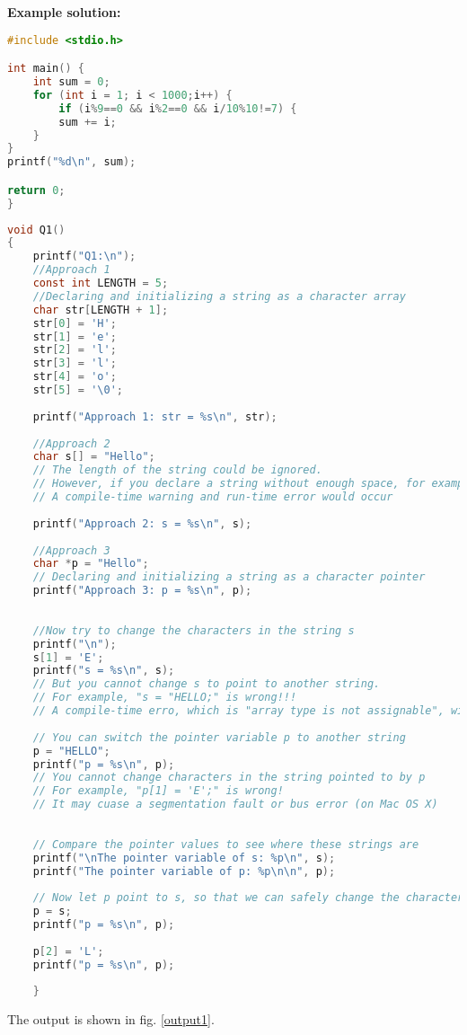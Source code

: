\documentclass[12pt]{article}
\begin{document}
\textbf{Example solution:}
\begin{lstlisting}[language=C]
#include <stdio.h>

int main() {
	int sum = 0;
	for (int i = 1; i < 1000;i++) {
		if (i%9==0 && i%2==0 && i/10%10!=7) {
		sum += i;
	}
}
printf("%d\n", sum);

return 0;
}

\end{lstlisting}
\iffalse
\begin{lstlisting}[language=C, caption=Solution 1]
void Q1()
{
    printf("Q1:\n");
    //Approach 1
	const int LENGTH = 5; 
    //Declaring and initializing a string as a character array
    char str[LENGTH + 1];
    str[0] = 'H';
    str[1] = 'e';
    str[2] = 'l';
    str[3] = 'l';
    str[4] = 'o';
    str[5] = '\0';
    
    printf("Approach 1: str = %s\n", str);
    
    //Approach 2
    char s[] = "Hello";
    // The length of the string could be ignored.
    // However, if you declare a string without enough space, for example "char s[4] = "Hello";"
    // A compile-time warning and run-time error would occur
    
    printf("Approach 2: s = %s\n", s);
    
    //Approach 3
    char *p = "Hello";
    // Declaring and initializing a string as a character pointer
    printf("Approach 3: p = %s\n", p);
    
    
    //Now try to change the characters in the string s
    printf("\n");
    s[1] = 'E';
    printf("s = %s\n", s);
    // But you cannot change s to point to another string. 
    // For example, "s = "HELLO;" is wrong!!!
    // A compile-time erro, which is "array type is not assignable", will occur
    
    // You can switch the pointer variable p to another string
    p = "HELLO";
    printf("p = %s\n", p);
    // You cannot change characters in the string pointed to by p
    // For example, "p[1] = 'E';" is wrong!
    // It may cuase a segmentation fault or bus error (on Mac OS X)
    
    
    // Compare the pointer values to see where these strings are
    printf("\nThe pointer variable of s: %p\n", s);
    printf("The pointer variable of p: %p\n\n", p);
    
    // Now let p point to s, so that we can safely change the characters
    p = s;
    printf("p = %s\n", p);
    
    p[2] = 'L';
    printf("p = %s\n", p);
    
    }
\end{lstlisting}
The output is shown in fig. \ref{output1}.
\end{document}
